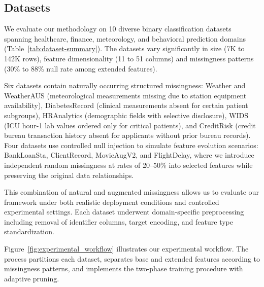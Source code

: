 \documentclass[sigconf]{acmart}
\begin{document}
\begin{itemize}
\subsection{Datasets}
We evaluate our methodology on 10 diverse binary classification datasets spanning healthcare, finance, meteorology, and behavioral prediction domains (Table~\ref{tab:dataset-summary}). The datasets vary significantly in size (7K to 142K rows), feature dimensionality (11 to 51 columns) and missingness patterns (30\% to 88\% null rate among extended features).

Six datasets contain naturally occurring structured missingness: Weather and WeatherAUS (meteorological measurements missing due to station equipment availability), DiabetesRecord (clinical measurements absent for certain patient subgroups), HRAnalytics (demographic fields with selective disclosure), WIDS (ICU hour-1 lab values ordered only for critical patients), and CreditRisk (credit bureau transaction history absent for applicants without prior bureau records). Four datasets use controlled null injection to simulate feature evolution scenarios: BankLoanSta, ClientRecord, MovieAugV2, and FlightDelay, where we introduce independent random missingness at rates of 20--50\% into selected features while preserving the original data relationships.

This combination of natural and augmented missingness allows us to evaluate our framework under both realistic deployment conditions and controlled experimental settings. Each dataset underwent domain-specific preprocessing including removal of identifier columns, target encoding, and feature type standardization.

Figure~\ref{fig:experimental_workflow} illustrates our experimental workflow. The process partitions each dataset, separates base and extended features according to missingness patterns, and implements the two-phase training procedure with adaptive pruning.




\end{itemize}
\end{document}
